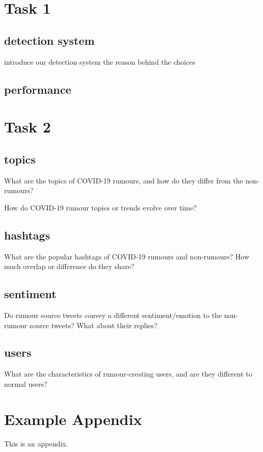 \documentclass[11pt, a4paper]{article}
\begin{document}
\section{Task 1}

\subsection{detection system}

introduce our detection system
the reason behind the choices

\subsection{performance}

\section{Task 2}

\subsection{topics}
What are the topics of COVID-19 rumours, and how do they differ from the non-rumours?

How do COVID-19 rumour topics or trends evolve over time?

\subsection{hashtags}
What are the popular hashtags of COVID-19 rumours and non-rumours? How much overlap or difference do they share?

\subsection{sentiment}
Do rumour source tweets convey a different sentiment/emotion to the non-rumour source tweets? What about their replies?

\subsection{users}
What are the characteristics of rumour-creating users, and are they different to normal users?




\appendix

\section{Example Appendix}
\label{sec:appendix}

This is an appendix.
\end{document}

